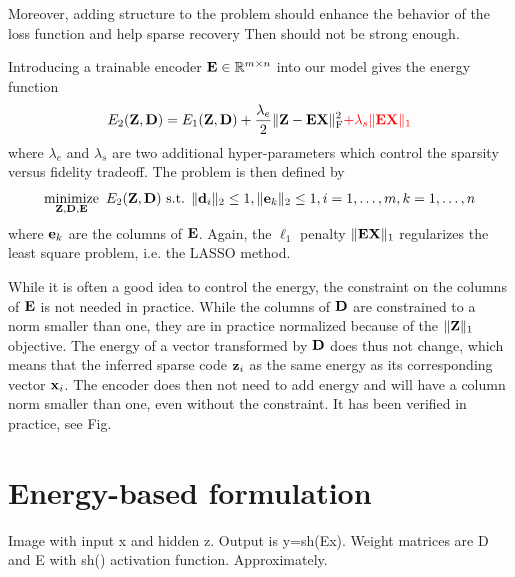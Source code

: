 Moreover, adding structure to the problem should enhance the behavior of the loss function and help sparse recovery \cite{kowalski2009sparse, baraniuk2010modelCS, huang2011LearningStructuredSparsity, jenatton2011structured} {\color{red}Then \cite{donoho2003OptSparse} should not be strong enough.}

Introducing a trainable encoder $\mathbf{E} \in \mathbb{R}^{m \times n}$ into our model gives the energy function
\begin{equation}\label{eqn:en_encoder}
	E_2(\mathbf{Z}, \mathbf{D}) = E_1(\mathbf{Z}, \mathbf{D}) + \frac{\lambda_e}{2} \| \mathbf{Z} - \mathbf{E} \mathbf{X} \|_\text{F}^2 {\color{red} + \lambda_s \| \mathbf{E} \mathbf{X} \|_1}
\end{equation}
where $\lambda_e$ and $\lambda_s$ are two additional hyper-parameters which control the sparsity versus fidelity tradeoff. The problem is then defined by
\begin{equation}\label{eqn:pr_encoder}
	\operatorname*{minimize}\limits_{\mathbf{Z},\mathbf{D},\mathbf{E}} \  E_2(\mathbf{Z}, \mathbf{D}) \text{ s.t. } \|\mathbf{d}_i\|_2 \leq 1 , \|\mathbf{e}_k\|_2 \leq 1 ,
	i = 1, \ldots, m , k = 1, \ldots, n
\end{equation}
where $\mathbf{e}_k$ are the columns of $\mathbf{E}$. Again, the $\ell_1$ penalty $\| \mathbf{E} \mathbf{X} \|_1$ regularizes the least square problem, i.e. the \gls{LASSO} method.

While it is often a good idea to control the energy, the constraint on the columns of $\mathbf{E}$ is not needed in practice. While the columns of $\mathbf{D}$ are constrained to a norm smaller than one, they are in practice normalized because of the $\| \mathbf{Z} \|_1$ objective. The energy of a vector transformed by $\mathbf{D}$ does thus not change, which means that the inferred sparse code $\mathbf{z}_i$ as the same energy as its corresponding vector $\mathbf{x}_i$. The encoder does then not need to add energy and will have a column norm smaller than one, even without the constraint. It has been verified in practice, see {\color{red} Fig}.

\section{Energy-based formulation}


{\color{red} Image with input x and hidden z. Output is y=sh(Ex). Weight matrices are D and E with sh() activation function. Approximately.}

